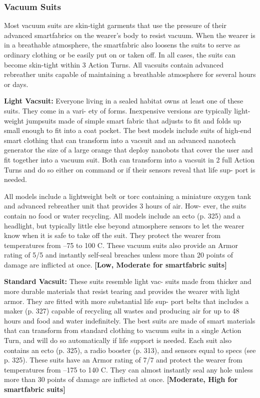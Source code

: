 \subsubsection{Vacuum Suits}

Most vacuum suits are skin-tight garments that use 
the pressure of their advanced smartfabrics on the 
wearer's body to resist vacuum. When the wearer is in 
a breathable atmosphere, the smartfabric also loosens 
the suits to serve as ordinary clothing or be easily 
put on or taken off. In all cases, the suits can become 
skin-tight within 3 Action Turns. All vacsuits contain 
advanced rebreather units capable of maintaining a 
breathable atmosphere for several hours or days.

\textbf{Light Vacsuit:} Everyone living in a sealed habitat 
owns at least one of these suits. They come in a vari-
ety of forms. Inexpensive versions are typically light-
weight jumpsuits made of simple smart fabric that 
adjusts to fit and folds up small enough to fit into a 
coat pocket. The best models include suits of high-end 
smart clothing that can transform into a vacsuit and 
an advanced nanotech generator the size of a large 
orange that deploy nanobots that cover the user and 
fit together into a vacuum suit. Both can transform 
into a vacsuit in 2 full Action Turns and do so either 
on command or if their sensors reveal that life sup-
port is needed.

All models include a lightweight belt or torc 
containing a miniature oxygen tank and advanced 
rebreather unit that provides 3 hours of air. How-
ever, the suits contain no food or water recycling. All 
models include an ecto (p. 325) and a headlight, but 
typically little else beyond atmosphere sensors to let 
the wearer know when it is safe to take off the suit. 
They protect the wearer from temperatures from –75 
to 100 C. These vacuum suits also provide an Armor 
rating of 5/5 and instantly self-seal breaches unless 
more than 20 points of damage are inflicted at once. 
\textbf{[Low, Moderate for smartfabric suits]}

\textbf{Standard Vacsuit:} These suits resemble light vac-
suits made from thicker and more durable materials 
that resist tearing and provides the wearer with light 
armor. They are fitted with more substantial life sup-
port belts that includes a maker (p. 327) capable of 
recycling all wastes and producing air for up to 48 
hours and food and water indefinitely. The best suits 
are made of smart materials that can transform from 
standard clothing to vacuum suits in a single Action 
Turn, and will do so automatically if life support is 
needed. Each suit also contains an ecto (p. 325), a 
radio booster (p. 313), and sensors equal to specs (see 
p. 325). These suits have an Armor rating of 7/7 and 
protect the wearer from temperatures from –175 to 
140 C. They can almost instantly seal any hole unless 
more than 30 points of damage are inflicted at once. 
\textbf{[Moderate, High for smartfabric suits]}

